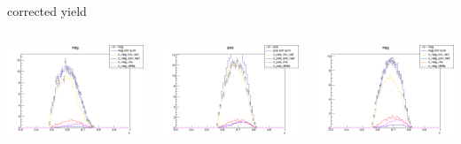 \begin{frame}{corrected yield}
\begin{columns}
\begin{column}[T]{0.25\textwidth}
\includegraphics[width = \textwidth]{results/yield/statistics_corr/yield_x_Q2_z_0.50_3.979_0.60_neg.png}
\end{column}
\begin{column}[T]{0.25\textwidth}
\includegraphics[width = \textwidth]{results/yield/statistics_corr/yield_x_Q2_z_0.50_3.979_0.70_pos.png}
\end{column}
\begin{column}[T]{0.25\textwidth}
\includegraphics[width = \textwidth]{results/yield/statistics_corr/yield_x_Q2_z_0.50_3.979_0.70_neg.png}
\end{column}
\end{columns}
\end{frame}
